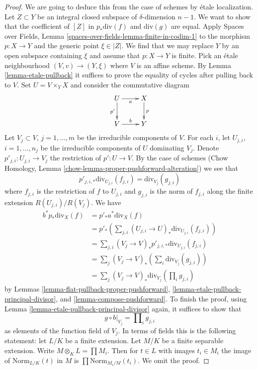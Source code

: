 \documentclass{stacks-project}
\theoremstyle{plain}
\theoremstyle{definition}
\theoremstyle{remark}
\numberwithin{equation}{subsection}
\begin{document}
\begin{proof}
We are going to deduce this from the case of schemes by \'etale localization.
Let $Z \subset Y$ be an integral closed subspace of $\delta$-dimension
$n - 1$. We want to show that the coefficient of $[Z]$ in
$p_*\text{div}(f)$ and $\text{div}(g)$ are equal. Apply
Spaces over Fields, Lemma \ref{spaces-over-fields-lemma-finite-in-codim-1}
to the morphism $p : X \to Y$ and the generic point $\xi \in |Z|$.
We find that we may replace $Y$ by an open subspace containing $\xi$
and assume that $p : X \to Y$ is finite. Pick an \'etale neighbourhood
$(V, v) \to (Y, \xi)$ where $V$ is an affine scheme.
By Lemma \ref{lemma-etale-pullback} it suffices to prove the equality
of cycles after pulling back to $V$.
Set $U = V \times_Y X$ and consider the commutative diagram
$$
\xymatrix{
U \ar[r]_a \ar[d]_{p'} & X \ar[d]^p \\
V \ar[r]^b & Y
}
$$
Let $V_j \subset V$, $j = 1, \ldots, m$ be the irreducible components
of $V$. For each $i$, let $U_{j, i}$, $i = 1, \ldots, n_j$ be the
irreducible components of $U$ dominating $V_j$. Denote
$p'_{j, i} : U_{j, i} \to V_j$ the restriction of $p' : U \to V$.
By the case of schemes
(Chow Homology, Lemma \ref{chow-lemma-proper-pushforward-alteration})
we see that
$$
p'_{j, i, *}\text{div}_{U_{j, i}}(f_{j, i}) = \text{div}_{V_j}(g_{j, i})
$$
where $f_{j, i}$ is the restriction of $f$ to $U_{j, i}$ and
$g_{j, i}$ is the norm of $f_{j, i}$ along the finite extension
$R(U_{j, i})/R(V_j)$. We have
\begin{align*}
b^* p_*\text{div}_X(f)
& =
p'_* a^* \text{div}_X(f) \\
& =
p'_*\left(\sum\nolimits_{j, i}
(U_{j, i} \to U)_*\text{div}_{U_{j, i}}(f_{j, i})\right) \\
& =
\sum\nolimits_{j, i}
(V_j \to V)_*p'_{j, i, *}\text{div}_{U_{j, i}}(f_{j, i}) \\
& =
\sum\nolimits_j
(V_j \to V)_*\left(\sum\nolimits_i \text{div}_{V_j}(g_{j, i})\right) \\
& =
\sum\nolimits_j (V_j \to V)_*\text{div}_{V_j}(\prod\nolimits_i g_{j, i})
\end{align*}
by Lemmas
\ref{lemma-flat-pullback-proper-pushforward},
\ref{lemma-etale-pullback-principal-divisor}, and
\ref{lemma-compose-pushforward}.
To finish the proof, using Lemma \ref{lemma-etale-pullback-principal-divisor}
again, it suffices to show that
$$
g \circ b|_{V_j} = \prod\nolimits_i g_{j, i}
$$
as elements of the function field of $V_j$. In terms of fields
this is the following statement: let $L/K$ be a finite extension.
Let $M/K$ be a finite separable extension. Write
$M \otimes_K L = \prod M_i$. Then for $t \in L$ with images
$t_i \in M_i$ the image of
$\text{Norm}_{L/K}(t)$ in $M$ is $\prod \text{Norm}_{M_i/M}(t_i)$.
We omit the proof.
\end{proof}
\end{document}
